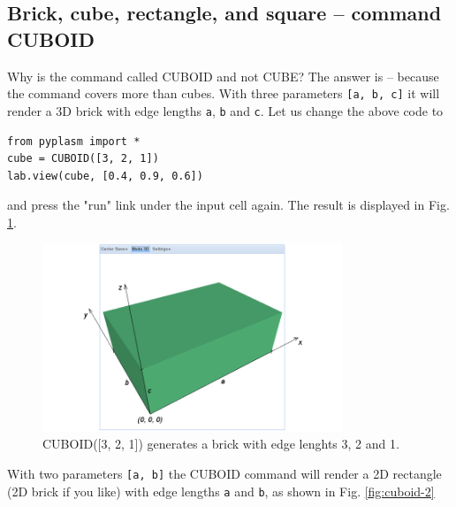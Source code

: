 \documentclass[article,A4,12pt]{llncs}
\begin{document}
 
\subsection{Brick, cube, rectangle, and square -- command CUBOID}

Why is the command called 
CUBOID and not CUBE? The answer is -- because the command covers more 
than cubes. With three parameters {\tt [a, b, c]} it will render 
a 3D brick with edge lengths {\tt a}, {\tt b} and {\tt c}. Let us change the 
above code to  

\begin{verbatim}
from pyplasm import *
cube = CUBOID([3, 2, 1])
lab.view(cube, [0.4, 0.9, 0.6])
\end{verbatim}
and press the "run" link under the input cell again. The result is 
displayed in Fig. \ref{fig:cuboid-1}.

\newpage

\begin{figure}[!ht]
\begin{center}
\includegraphics[width=0.8\textwidth]{img/cuboid-1.png}
\end{center}
\vspace{-2mm}
\caption{CUBOID([3, 2, 1]) generates a brick with edge lenghts 3, 2 and 1.}
\label{fig:cuboid-1}
\end{figure}
\noindent
With two parameters {\tt [a, b]} the CUBOID command will render a 2D rectangle 
(2D brick if you like) with edge lengths {\tt a} and {\tt b}, as shown in 
Fig. \ref{fig:cuboid-2}
\end{document}
